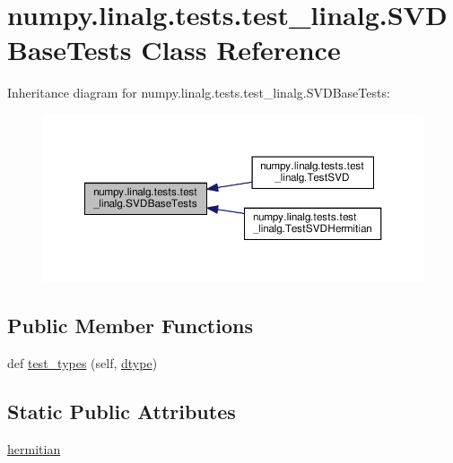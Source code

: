 \hypertarget{classnumpy_1_1linalg_1_1tests_1_1test__linalg_1_1SVDBaseTests}{}\section{numpy.\+linalg.\+tests.\+test\+\_\+linalg.\+S\+V\+D\+Base\+Tests Class Reference}
\label{classnumpy_1_1linalg_1_1tests_1_1test__linalg_1_1SVDBaseTests}


Inheritance diagram for numpy.\+linalg.\+tests.\+test\+\_\+linalg.\+S\+V\+D\+Base\+Tests\+:
\nopagebreak
\begin{figure}[H]
\begin{center}
\leavevmode
\includegraphics[width=350pt]{classnumpy_1_1linalg_1_1tests_1_1test__linalg_1_1SVDBaseTests__inherit__graph}
\end{center}
\end{figure}
\subsection*{Public Member Functions}
\begin{DoxyCompactItemize}
\item 
def \hyperlink{classnumpy_1_1linalg_1_1tests_1_1test__linalg_1_1SVDBaseTests_a8c80d8c4f6df6085401350aadc749497}{test\+\_\+types} (self, \hyperlink{namespacenumpy_1_1linalg_1_1tests_1_1test__linalg_a1063ea74fa35b7244592f8a89b8a71a2}{dtype})
\end{DoxyCompactItemize}
\subsection*{Static Public Attributes}
\begin{DoxyCompactItemize}
\item 
\hyperlink{classnumpy_1_1linalg_1_1tests_1_1test__linalg_1_1SVDBaseTests_a50d3199a98ce4290010428dd2b781d92}{hermitian}
\end{DoxyCompactItemize}



